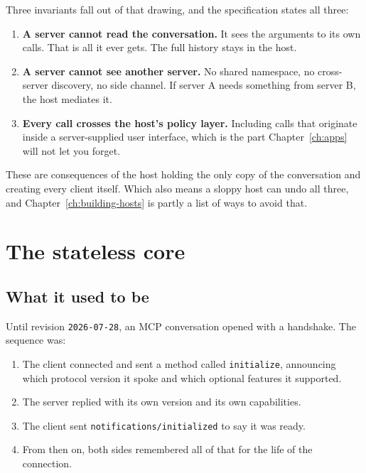 
Three invariants fall out of that drawing, and the specification states all
three:

\begin{enumerate}[leftmargin=1.6em, itemsep=4pt]
\item \textbf{A server cannot read the conversation.} It sees the arguments to
its own calls. That is all it ever gets. The full history stays in the host.
\item \textbf{A server cannot see another server.} No shared namespace, no
cross-server discovery, no side channel. If server A needs something from server
B, the host mediates it.
\item \textbf{Every call crosses the host's policy layer.} Including calls that
originate inside a server-supplied user interface, which is the part
Chapter~\ref{ch:apps} will not let you forget.
\end{enumerate}

These are consequences of the host holding the only copy of the conversation and
creating every client itself. Which also means a sloppy host can undo all three,
and Chapter~\ref{ch:building-hosts} is partly a list of ways to avoid that.

\section{The stateless core}

\subsection{What it used to be}

Until revision \texttt{2026-07-28}, an MCP conversation opened with a handshake.
The sequence was:

\begin{enumerate}[leftmargin=1.6em, itemsep=3pt]
\item The client connected and sent a method called \texttt{initialize},
      announcing which protocol version it spoke and which optional features it
      supported.
\item The server replied with its own version and its own capabilities.
\item The client sent \texttt{notifications/initialized} to say it was ready.
\item From then on, both sides remembered all of that for the life of the
      connection.
\end{enumerate}

